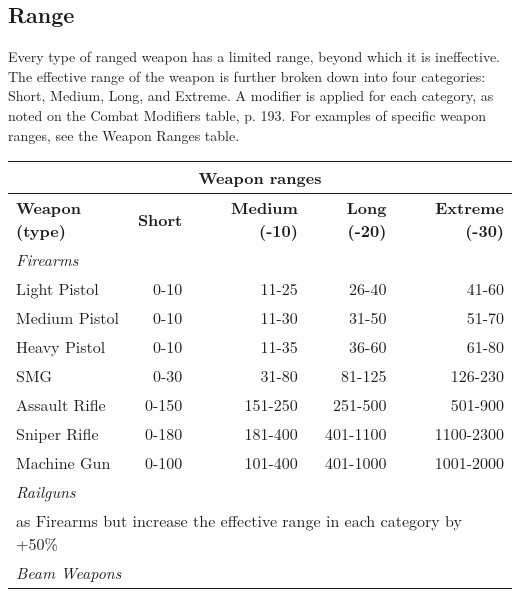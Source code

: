 \subsection{Range} \label{sec:range} 

Every type of ranged weapon has a limited range, beyond which it is ineffective. The effective range of the weapon is further broken down into four categories: Short, Medium, Long, and Extreme. A modifier is applied for each category, as noted on the Combat Modifiers table, p. 193. For examples of specific weapon ranges, see the Weapon Ranges table. 

\begin{table} \begin{tabularx}{\textwidth}{|X|r|r|r|r|} \hline

\multicolumn{5}{|c|}{\textbf{Weapon ranges}} \\ \hline

\textbf{Weapon (type)} &\textbf{Short} &\textbf{Medium (-10)} &\textbf{Long (-20)} &\textbf{Extreme (-30)}\\ \hline

\multicolumn{5}{|l|}{\emph{Firearms}} \\ \hline

Light Pistol	&0-10	&11-25	&26-40	&41-60	\\ \hline

Medium Pistol	&0-10	&11-30	&31-50	&51-70	\\ \hline

Heavy Pistol	&0-10	&11-35	&36-60	&61-80	\\ \hline

SMG	&0-30	&31-80	&81-125	&126-230	\\ \hline

Assault Rifle	&0-150	&151-250	&251-500	&501-900	\\ \hline

Sniper Rifle	&0-180	&181-400	&401-1100	&1100-2300	\\ \hline

Machine Gun	&0-100	&101-400	&401-1000	&1001-2000	\\ \hline

\multicolumn{5}{|l|}{\emph{Railguns}}\\ \hline

\multicolumn{5}{|l|}{as Firearms but increase the effective range in each category by +50\%} \\ \hline

\multicolumn{5}{|l|}{\emph{Beam Weapons}} \\ \hline


\end{tabularx}
\end{table}
